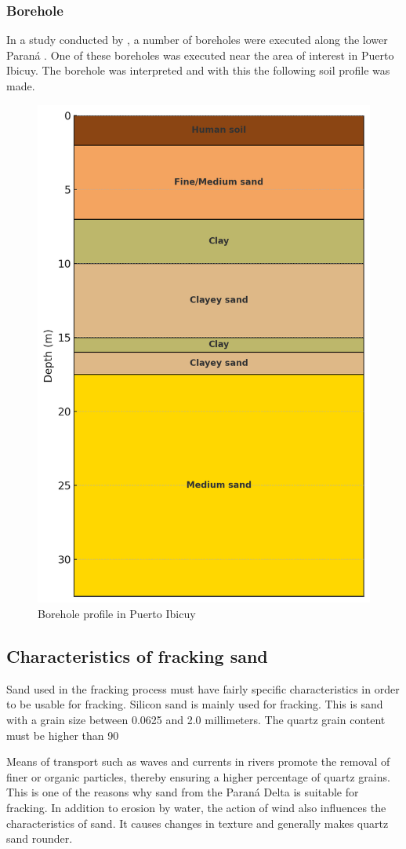 \subsubsection{Borehole}
In a study conducted by \citeauthor{amatoESTRATIGRAFIACUATERNARIASUBSUELO2009}, a number of boreholes were executed along the lower Paraná \autocite{amatoESTRATIGRAFIACUATERNARIASUBSUELO2009}. One of these boreholes was executed near the area of interest in Puerto Ibicuy. The borehole was interpreted and with this the following soil profile was made.

\begin{figure}[H]
    \centering
    \includegraphics[width=0.45\linewidth]{figures//ch9/Bodemprofiel.png}
    \caption{Borehole profile in Puerto Ibicuy \autocite{amatoESTRATIGRAFIACUATERNARIASUBSUELO2009}}
    \label{fig:borehole}
\end{figure}

\subsection{Characteristics of fracking sand}
\label{sec:Charact. of fs}
Sand used in the fracking process must have fairly specific characteristics in order to be usable for fracking. Silicon sand is mainly used for fracking. This is sand with a grain size between 0.0625 and 2.0 millimeters. The quartz grain content must be higher than 90%

Means of transport such as waves and currents in rivers promote the removal of finer or organic particles, thereby ensuring a higher percentage of quartz grains. This is one of the reasons why sand from the Paraná Delta is suitable for fracking.
In addition to erosion by water, the action of wind also influences the characteristics of sand. It causes changes in texture and generally makes quartz sand rounder. 

